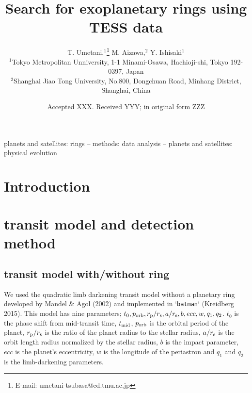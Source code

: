 \documentclass[fleqn,usenatbib, onecolumn,dvipdfmx]{mnras}
\title{Search for exoplanetary rings using TESS data}
\author[T. Umetani et al.]{
T. Umetani,$^{1}$\thanks{E-mail: umetani-tsubasa@ed.tmu.ac.jp}
M. Aizawa,$^{2}$
Y. Ishisaki$^{1}$
\\
$^{1}$Tokyo Metropolitan Unniversity, 1-1 Minami-Osawa, Hachioji-shi, Tokyo 192-0397, Japan\\
$^{2}$Shanghai Jiao Tong University, No.800, Dongchuan Road, Minhang District, Shanghai, China\\
}
\date{Accepted XXX. Received YYY; in original form ZZZ}
\begin{document}
\label{firstpage}
\pagerange{\pageref{firstpage}--\pageref{lastpage}}
\maketitle

\begin{abstract}

\end{abstract}

\begin{keywords}
planets and satellites: rings -- methods: data analysis -- planets and satellites: physical evolution
\end{keywords}



\section{Introduction}

\section{transit model and detection method}
\subsection{transit model with/without ring} \label{transit model with/without ring}
We used the quadratic limb darkening transit model without a planetary ring developed by Mandel \& Agol (2002) and implemented in `\texttt{batman}` (Kreidberg 2015). This model has nine parameters; $t_0, p_{\rm{orb}}, r_{\rm{p}}/r_{\rm{s}}, a/r_{\rm{s}}, b, ecc, w, q_1, q_2$. $t_0$ is the phase shift from mid-transit time, $t_{\rm{mid}}$, $p_{\rm{orb}}$ is the orbital period of the planet, $r_{\rm{p}}/r_{\rm{s}}$ is the ratio of the planet radius to the stellar radius, $a/r_{\rm{s}}$ is the orbit length radius normalized by the stellar radius, $b$ is the impact parameter, $ecc$ is the planet's eccentricity, $w$ is the longitude of the periastron and $q_{1}$ and $q_{2}$ is the limb-darkening parameters.
\end{document}
